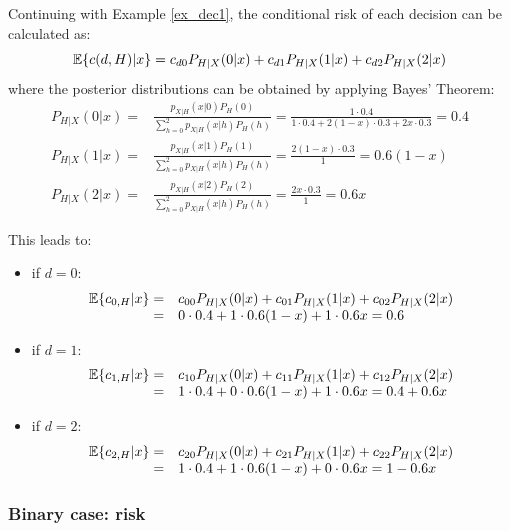 \begin{example} \label{ex_dec2}
Continuing with Example \ref{ex_dec1}, the conditional risk of each decision can be calculated as:
$$\mathbb{E}\{c(d,H)|x\}=  c_{d0} P_{H|X}(0|x) +  c_{d1} P_{H|X}(1|x) + c_{d2} P_{H|X}(2|x) $$
where the posterior distributions can be obtained by applying Bayes' Theorem:
\begin{align*} 
P_{H|X}(0|x) =& \frac{p_{X|H}(x|0) P_H(0)}{\sum_{h=0}^2 p_{X|H}(x|h) P_H(h) } 
             =  \frac{1 \cdot 0.4} { 1 \cdot 0.4 + 2(1-x) \cdot 0.3 + 2x \cdot 0.3} 
             =  0.4 \\ 
P_{H|X}(1|x) =& \frac{p_{X|H}(x|1) P_H(1)}{\sum_{h=0}^2 p_{X|H}(x|h) P_H(h) } 
             =  \frac{2(1-x)\cdot 0.3} { 1 } =0.6(1-x) \\ 
P_{H|X}(2|x) =& \frac{p_{X|H}(x|2) P_H(2)}{\sum_{h=0}^2 p_{X|H}(x|h) P_H(h) } = \frac{2x\cdot 0.3} {1} =0.6x 
\end{align*}

This leads to:
\begin{itemize}
\item if $d=0$:
$$\begin{array}{rl} 
\mathbb{E}\{c_{0,H}|x\} =& c_{00} P_{H|X}(0|x) +  c_{01} P_{H|X}(1|x) + c_{02} P_{H|X}(2|x) \\
                 =& 0 \cdot 0.4+ 1 \cdot 0.6(1-x) + 1 \cdot 0.6x= 0.6 
\end{array}$$
\item if $d=1$:
$$\begin{array}{rl} 
\mathbb{E}\{c_{1,H}|x\} =& c_{10} P_{H|X}(0|x) +  c_{11} P_{H|X}(1|x) + c_{12} P_{H|X}(2|x) \\
                 =& 1 \cdot 0.4+ 0 \cdot 0.6(1-x) + 1 \cdot 0.6x= 0.4+0.6x 
\end{array}$$
\item if  $d=2$:
$$\begin{array}{rl} 
\mathbb{E}\{c_{2,H}|x\} =& c_{20} P_{H|X}(0|x) +  c_{21} P_{H|X}(1|x) + c_{22} P_{H|X}(2|x) \\
                 =& 1 \cdot 0.4+ 1 \cdot 0.6(1-x) + 0 \cdot 0.6x=  1-0.6x 
\end{array}$$
\end{itemize} 
\end{example}

\subsubsection{Binary case: risk}

